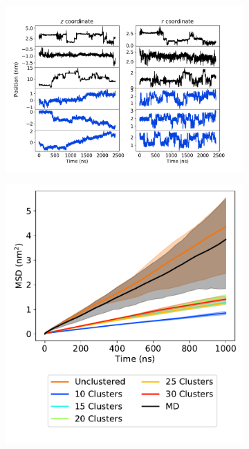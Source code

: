 \documentclass[journal=jpcbfk,manuscript=article]{achemso}
\begin{document}
  \begin{figure}
  \centering
  \begin{subfigure}{0.63\textwidth}
  \includegraphics[width=\textwidth]{qualitative_clustered_MET_10.pdf}
  \caption{}\label{fig:qualitative_clustered_MET}
  \end{subfigure}
  \begin{subfigure}{0.35\textwidth}
  \vspace{2.25em}
  \includegraphics[width=\textwidth]{msd_nclusters.pdf}

\end{subfigure}
\end{figure}
\end{document}
